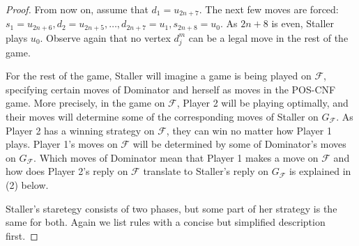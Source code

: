\documentclass[12pt]{article}
\newcommand{\F}{\mathcal{F}}
\begin{document}
\begin{proof}
	From now on, assume that $d_1 = u_{2n+7}$. The next few moves are forced: $s_1 = u_{2n+6}, d_2 = u_{2n+5}, \ldots, d_{2n+7} = u_1, s_{2n+8} = u_0$. As $2n+8$ is even, Staller plays $u_0$. Observe again that no vertex $d_j^m$ can be a legal move in the rest of the game.
	
	For the rest of the game, Staller will imagine a game is being played on $\F$, specifying certain moves of Dominator and herself as moves in the POS-CNF game. More precisely, in the game on $\F$, Player 2 will be playing optimally, and their moves will determine some of the corresponding moves of Staller on $G_\F$. As Player 2 has a winning strategy on $\F$, they can win no matter how Player 1 plays. Player 1's moves on $\F$ will be determined by some of Dominator's moves on $G_\F$. Which moves of Dominator mean that Player 1 makes a move on $\F$ and how does Player 2's reply on $\F$ translate to Staller's reply on $G_\F$ is explained in (2) below.
	
	 Staller's staretegy consists of two phases, but some part of her strategy is the same for both. Again we list rules with a concise but simplified description first.
	

\end{proof}
\end{document}

